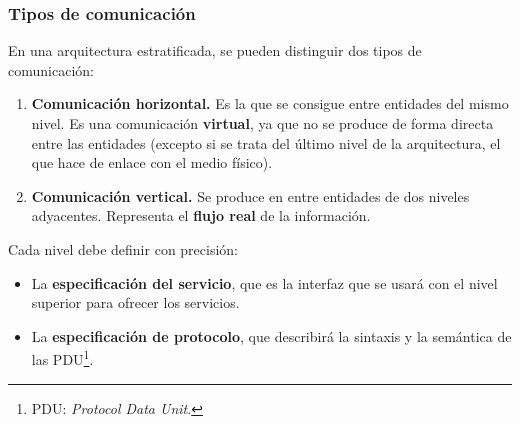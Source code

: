 \documentclass[a4paper]{book}
\numberwithin{figure}{chapter}
\numberwithin{equation}{subsection}
\begin{document}
\subsubsection{Tipos de comunicación}
En una arquitectura estratificada, se pueden distinguir dos tipos de comunicación:
\begin{enumerate}
  \item \textbf{Comunicación horizontal.} Es la que se consigue entre entidades del mismo nivel. Es una comunicación \textbf{virtual}, ya que no se produce de forma directa entre las entidades (excepto si se trata del último nivel de la arquitectura, el que hace de enlace con el medio físico).
  \item \textbf{Comunicación vertical.} Se produce en entre entidades de dos niveles adyacentes. Representa el \textbf{flujo real} de la información.
\end{enumerate}

Cada nivel debe definir con precisión:
\begin{itemize}
  \item La \textbf{especificación del servicio}, que es la interfaz que se usará con el nivel superior para ofrecer los servicios.
  \item La \textbf{especificación de protocolo}, que describirá la sintaxis y la semántica de las PDU\footnote{PDU: \textsl{Protocol Data Unit}.}.
\end{itemize}
\end{document}
